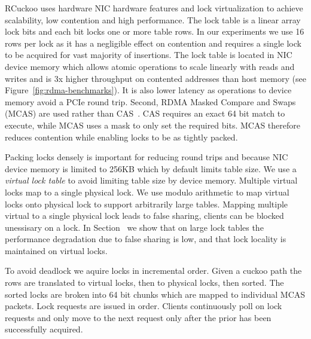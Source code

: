 
RCuckoo uses hardware NIC hardware features and lock
virtualization to achieve scalability, low contention and
high performance. The lock table is a linear array lock bits
and each bit locks one or more table rows. In our
experiments we use 16 rows per lock as it has a negligible
effect on contention and requires a single lock to be
acquired for vast majority of insertions.
The lock table is located in NIC device memory which allows
atomic operations to scale linearly with reads and writes
and is 3x higher throughput on contented addresses than host
memory (see Figure~\ref{fig:rdma-benchmarks}). It is also
lower latency as operations to device memory avoid a PCIe
round trip.  Second, RDMA Masked Compare and Swaps (MCAS)
are used rather than CAS~\cite{rdma-masked-cas,sherman}. CAS
requires an exact 64 bit match to execute, while MCAS uses a
mask to only set the required bits. MCAS therefore reduces
contention while enabling locks to be as tightly packed.

Packing locks densely is important for reducing round trips
and because  NIC device memory is limited to 256KB which by
default limits table size. We use a \textit{virtual lock
table} to avoid limiting table size by device memory.
Multiple virtual locks map to a single physical lock. We use
modulo arithmetic to map virtual locks onto physical lock to
support arbitrarily large tables. Mapping multiple virtual
to a single physical lock leads to false sharing, clients
can be blocked unessisary on a lock.  In Section~
we show that on large lock tables the performance
degradation due to false sharing is low, and that lock
locality is maintained on virtual locks.

To avoid deadlock we aquire locks in incremental order.
Given a cuckoo path the rows are translated to virtual
locks, then to physical locks, then sorted. The sorted
locks are broken into 64 bit chunks which are mapped to
individual MCAS packets.  Lock requests are issued in order.
Clients continuously poll on lock requests and only move to
the next request only after the prior has been successfully
acquired.

